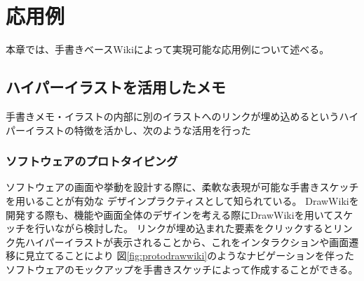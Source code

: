 \chapter{応用例}
\label{chap:ouyou}

本章では、手書きベースWikiによって実現可能な応用例について述べる。

\newpage

%

\section{ハイパーイラストを活用したメモ}
手書きメモ・イラストの内部に別のイラストへのリンクが埋め込めるというハイパーイラストの特徴を活かし、次のような活用を行った

\subsection{ソフトウェアのプロトタイピング}
ソフトウェアの画面や挙動を設計する際に、柔軟な表現が可能な手書きスケッチを用いることが有効な
デザインプラクティスとして知られている。
DrawWikiを開発する際も、機能や画面全体のデザインを考える際にDrawWikiを用いてスケッチを行いながら検討した。
リンクが埋め込まれた要素をクリックするとリンク先ハイパーイラストが表示されることから、これをインタラクションや画面遷移に見立てることにより
図\ref{fig:protodrawwiki}のようなナビゲーションを伴ったソフトウェアのモックアップを手書きスケッチによって作成することができる。

